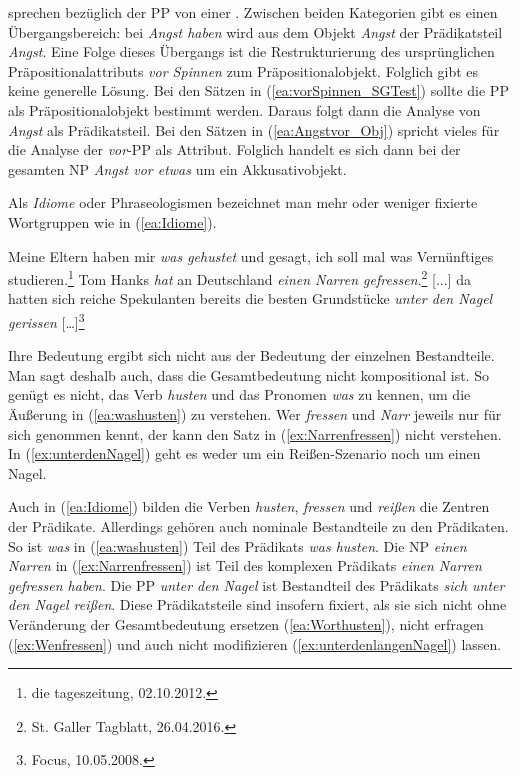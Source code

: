 \citet[441]{HeidolphFlaemigMotsch1981} sprechen bezüglich der PP von einer  . Zwischen beiden Kategorien gibt es einen Übergangsbereich: bei \textit{Angst haben} wird aus dem Objekt \textit{Angst} der Prädikatsteil \textit{Angst}. Eine Folge dieses Übergangs ist die Restrukturierung des ursprünglichen Präpositionalattributs \textit{vor Spinnen} zum Präpositionalobjekt. Folglich gibt es keine generelle Lösung. Bei den Sätzen in (\ref{ea:vorSpinnen_SGTest}) sollte die PP als Präpositionalobjekt bestimmt werden. Daraus folgt dann die Analyse von \textit{Angst} als Prädikatsteil. Bei den Sätzen in (\ref{ea:Angstvor_Obj}) spricht vieles für die Analyse der \textit{vor}-PP als Attribut. Folglich handelt es sich dann bei der gesamten NP \textit{Angst vor etwas} um ein Akkusativobjekt.

Als \textit{Idiome} oder Phraseologismen bezeichnet man mehr oder weniger fixierte Wortgruppen wie in (\ref{ea:Idiome}). 

\ea \label{ea:Idiome} 
\ea \label{ea:washusten} Meine Eltern haben mir \textit{was gehustet} und gesagt, ich soll mal was Vernünftiges studieren.\footnote{die tageszeitung, 02.10.2012.}
\ex \label{ex:Narrenfressen} Tom Hanks \textit{hat} an Deutschland \textit{einen Narren gefressen}.\footnote{St. Galler Tagblatt, 26.04.2016.}
\ex \label{ex:unterdenNagel} [...] da hatten sich reiche Spekulanten bereits die besten Grundstücke \textit{unter den Nagel gerissen} [\ldots{}]\footnote{Focus, 10.05.2008.} 
\z 
\z

Ihre Bedeutung ergibt sich nicht aus der Bedeutung der einzelnen Bestandteile. Man sagt deshalb auch, dass die Gesamtbedeutung nicht kompositional ist. So genügt es nicht, das Verb \textit{husten} und das Pronomen \textit{was} zu kennen, um die Äußerung in (\ref{ea:washusten}) zu verstehen. Wer \textit{fressen} und \textit{Narr} jeweils nur für sich genommen kennt, der kann den Satz in (\ref{ex:Narrenfressen}) nicht verstehen. In (\ref{ex:unterdenNagel}) geht es weder um ein Reißen-Szenario noch um einen Nagel.

Auch in (\ref{ea:Idiome}) bilden die Verben \textit{husten}, \textit{fressen} und \textit{reißen} die Zentren der Prädikate. Allerdings gehören auch nominale Bestandteile zu den Prädikaten. So ist \textit{was} in (\ref{ea:washusten}) Teil des Prädikats \textit{was husten}. Die NP \textit{einen Narren} in (\ref{ex:Narrenfressen}) ist Teil des komplexen Prädikats \textit{einen Narren gefressen haben}. Die PP \textit{unter den Nagel} ist Bestandteil des Prädikats \textit{sich unter den Nagel reißen}. Diese Prädikatsteile sind insofern fixiert, als sie sich nicht ohne Veränderung der Gesamtbedeutung ersetzen (\ref{ea:Worthusten}), nicht erfragen (\ref{ex:Wenfressen}) und auch nicht modifizieren (\ref{ex:unterdenlangenNagel}) lassen. 

